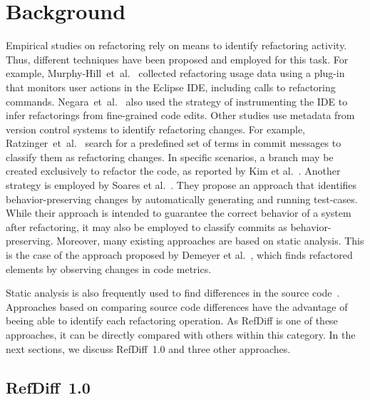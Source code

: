 \section{Background}
\label{SecBackground}

Empirical studies on refactoring rely on means to identify refactoring activity. Thus,  different techniques have been proposed and employed for this task.
For example, Murphy-Hill~et~al.~\cite{MurphyHill2012} collected refactoring usage data using a plug-in that monitors user actions in the Eclipse IDE, including calls to refactoring commands.
Negara~et~al.~\cite{negara2013} also used the strategy of instrumenting the IDE to infer refactorings from fine-grained code edits.
Other studies use metadata from version control systems to identify refactoring changes. For example, Ratzinger~et~al.~\cite{ratzinger2008relation} search for a predefined set of terms in commit messages to classify them as refactoring changes. In specific scenarios, a branch may be created exclusively to refactor the code, as reported by Kim et al.~\cite{kim-tse-2014}.
Another strategy is employed by Soares et al.~\cite{soares2010making}. They propose an approach that identifies behavior-preserving changes by automatically generating and running test-cases. While their approach is intended to guarantee the correct behavior of a system after refactoring, it may also be employed to classify commits as behavior-preserving.
Moreover, many existing approaches are based on static analysis.
This is the case of the approach proposed by Demeyer et al.~\cite{demeyer2000finding}, which finds refactored elements by observing changes in code metrics.

Static analysis is also frequently used to find differences in the source code~\cite{dig2006automated, weissgerber2006identifying, tsantalis_empiricalstudy,prete2010template,Kim:2010:RefFinder,msr2017,tsantalis2018rminer}.
Approaches based on comparing source code differences have the advantage of beeing able to identify each refactoring operation. As RefDiff is one of these approaches, it can be directly compared with others within this category. In the next sections, we discuss RefDiff~1.0 and three other approaches.

\subsection{RefDiff~1.0}

